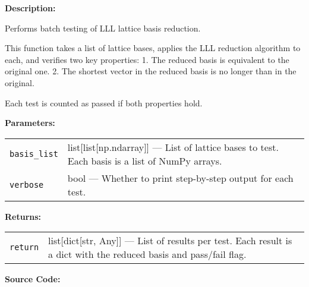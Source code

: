 \documentclass[a4paper,12pt]{article}
\begin{document}
\textbf{Description:}

Performs batch testing of LLL lattice basis reduction.

This function takes a list of lattice bases, applies the LLL reduction
algorithm to each, and verifies two key properties:
  1. The reduced basis is equivalent to the original one.
  2. The shortest vector in the reduced basis is no longer than in the original.

Each test is counted as passed if both properties hold.

\vspace{1em}
\newpage
\textbf{Parameters:}

\vspace{1em}
\noindent
\begin{tabular}{p{3cm} p{11cm}}
\texttt{basis\_list} & list[list[np.ndarray]] — List of lattice bases to test. Each basis is a list of NumPy arrays. \\
\texttt{verbose} & bool — Whether to print step-by-step output for each test. \\
\end{tabular}

\vspace{1em}
\noindent
\textbf{Returns:}

\begin{tabular}{p{3cm} p{11cm}}
\texttt{return} & list[dict[str, Any]] — List of results per test. Each result is a dict with the reduced basis and pass/fail flag. \\
\end{tabular}

\textbf{Source Code:}
\end{document}
